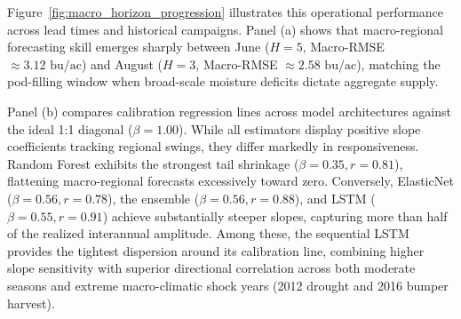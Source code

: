 Figure~\ref{fig:macro_horizon_progression} illustrates this operational performance across lead times and historical campaigns. Panel (a) shows that macro-regional forecasting skill emerges sharply between June ($H=5$, Macro-RMSE $\approx 3.12\text{ bu/ac}$) and August ($H=3$, Macro-RMSE $\approx 2.58\text{ bu/ac}$), matching the pod-filling window when broad-scale moisture deficits dictate aggregate supply. 

Panel (b) compares calibration regression lines across model architectures against the ideal 1:1 diagonal ($\beta = 1.00$). While all estimators display positive slope coefficients tracking regional swings, they differ markedly in responsiveness. Random Forest exhibits the strongest tail shrinkage ($\beta = 0.35, r = 0.81$), flattening macro-regional forecasts excessively toward zero. Conversely, ElasticNet ($\beta = 0.56, r = 0.78$), the ensemble ($\beta = 0.56, r = 0.88$), and LSTM ($\beta = 0.55, r = 0.91$) achieve substantially steeper slopes, capturing more than half of the realized interannual amplitude. Among these, the sequential LSTM provides the tightest dispersion around its calibration line, combining higher slope sensitivity with superior directional correlation across both moderate seasons and extreme macro-climatic shock years (2012 drought and 2016 bumper harvest).
